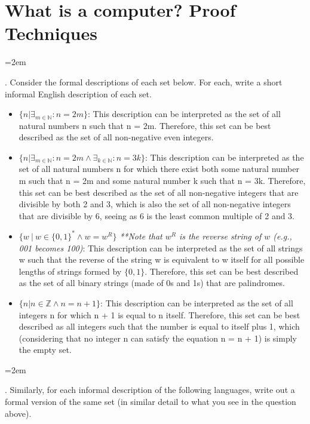 \documentclass[12pt]{article}
\def\homework{What is a computer? Proof Techniques}
\newcounter{quesnum}
\newcommand{\question}[2][??]{
\begin{list}{\labelitemi}{\leftmargin=2em}
\item [\arabic{quesnum}.] {} {#2}
\end{list}
\addtocounter{quesnum}{1}
}
\begin{document}
\section*{\homework}

\question[3]{
Consider the formal descriptions of each set below. For each, write a short informal English description of each set.
}

\begin{itemize}
    \item $\{n | \exists_{m \in \mathbb{N}} : n=2m\}$: This description can be interpreted as the set of all natural numbers n such that n = 2m. Therefore, this set can be best described as the set of all non-negative even integers.

    \item $\{n | \exists_{m \in \mathbb{N}} : n=2m \wedge \exists_{k \in \mathbb{N}} : n=3k \}$: This description can be interpreted as the set of all natural numbers n for which there exist both some natural number m such that n = 2m and some natural number k such that n = 3k. Therefore, this set can be best described as the set of all non-negative integers that are divisible by both 2 and 3, which is also the set of all non-negative integers that are divisible by 6, seeing as 6 is the least common multiple of 2 and 3.

    \item $\{ w \ | \ w \in \{0,1\}^* \wedge w=w^R \}$ \emph{**Note that $w^R$ is the reverse string of $w$ (e.g., 001 becomes 100)}: This description can be interpreted as the set of all strings w such that the reverse of the string w is equivalent to w itself for all possible lengths of strings formed by $\{0,1\}$. Therefore, this set can be best described as the set of all binary strings (made of 0s and 1s) that are palindromes.
 
    \item $\{ n | n \in \mathbb{Z} \wedge n=n+1 \}$: This description can be interpreted as the set of all integers n for which n + 1 is equal to n itself. Therefore, this set can be best described as all integers such that the number is equal to itself plus 1, which (considering that no integer n can satisfy the equation n = n + 1) is simply the empty set.
\end{itemize}

\vspace{12pt}

\question[3]{
Similarly, for each informal description of the following languages, write out a formal version of the same set (in similar detail to what you see in the question above).
}
\end{document}
